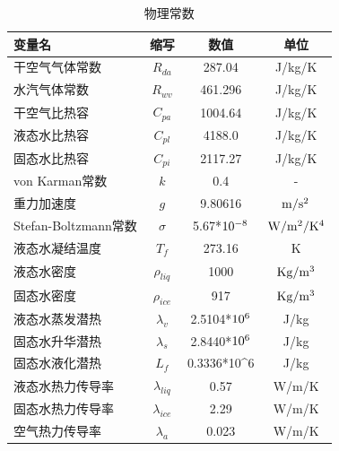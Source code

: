\begin{table}[]
\centering
\caption{物理常数}
\label{tab:物理常数}
\begin{tabular}{lccc}
\toprule
变量名&缩写&数值&单位 \\\midrule
干空气气体常数            & $R_{da}$                       & 287.04     & J/kg/K  \\ 
水汽气体常数             & $R_{wv}$                       & 461.296     & J/kg/K  \\
干空气比热容             & $C_{pa} $                      & 1004.64    & J/kg/K  \\
液态水比热容             & $C_{pl}$                       & 4188.0     & J/kg/K  \\
固态水比热容             & $C_{pi}$                       & 2117.27    & J/kg/K  \\
von Karman常数       & $k$                               & 0.4        &    -     \\
重力加速度              & $g$                               & 9.80616    & $\rm m/s^2$    \\
Stefan-Boltzmann常数 & $\sigma$           & 5.67*$\rm 10^{-8}$  & $\rm W/m^2/K^4$ \\
液态水凝结温度            & $T_f$                            & 273.16     & K       \\
液态水密度              & $\rho_{liq}$    & 1000       & $\rm Kg/m^3$   \\
固态水密度              & $\rho_{ice}$    & 917        & $\rm Kg/m^3$   \\
液态水蒸发潜热            & $\lambda_v$       & 2.5104*$\rm 10^{6}$ & J/kg    \\
固态水升华潜热            & $\lambda_s$       & 2.8440*$\rm 10^{6}$ & J/kg    \\
固态水液化潜热            & $L_f$                           & 0.3336*10^6 & J/kg    \\
液态水热力传导率           & $\lambda_{liq}$ & 0.57       & W/m/K   \\
固态水热力传导率           & $\lambda_{ice}$ & 2.29       & W/m/K   \\
空气热力传导率            & $\lambda_a$       & 0.023      & W/m/K      \\\bottomrule
\end{tabular}
\end{table}



